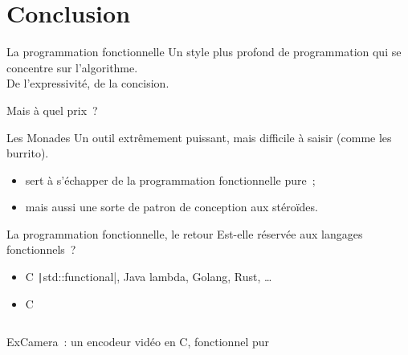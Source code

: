 \documentclass[10pt]{beamer}
\newcommand\CXX{C\nolinebreak[4]\hspace{-.05em}\raisebox{.4ex}{\relsize{-3}{\textbf{++}}}}
\begin{document}
\section{Conclusion}

\begin{frame}{La programmation fonctionnelle}
  Un style plus profond de programmation qui se concentre sur
  l'algorithme.\\
  De l'expressivité, de la concision.

  Mais à quel prix~?
\end{frame}

\begin{frame}{Les Monades}
  Un outil extrêmement puissant, mais difficile à saisir (comme les
  burrito).

  \begin{itemize}
  \item sert à s'échapper de la programmation fonctionnelle pure~;
  \item mais aussi une sorte de patron de conception aux stéroïdes.
  \end{itemize}
\end{frame}

\begin{frame}{La programmation fonctionnelle, le retour}
  Est-elle réservée aux langages fonctionnels~?
  \begin{itemize}
  \item \CXX{} \texttt|std::functional|, Java lambda, Golang, Rust, …
  \item C \inputminted{c}{./attributes.c}
  \end{itemize}

  ExCamera~\cite{fouladi2017encoding}: un encodeur vidéo en \CXX{},
  fonctionnel pur
\end{frame}

\begin{frame}[allowframebreaks]
  \nocite{*}
  \printbibliography{}
\end{frame}
\end{document}
